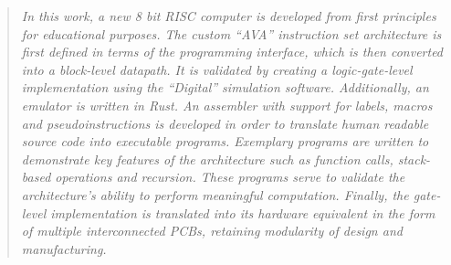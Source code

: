 \renewcommand{\abstractname}{Abstract}
\begin{abstract}
    \itshape
    In this work, a new 8 bit RISC computer is developed from first principles for educational purposes. The custom ``AVA'' instruction set architecture is first defined in terms of the programming interface, which is then converted into a block-level datapath. It is validated by creating a logic-gate-level implementation using the ``Digital'' simulation software. Additionally, an emulator is written in Rust. An assembler with support for labels, macros and pseudoinstructions is developed in order to translate human readable source code into executable programs. Exemplary programs are written to demonstrate key features of the architecture such as function calls, stack-based operations and recursion. These programs serve to validate the architecture's ability to perform meaningful computation. Finally, the gate-level implementation is translated into its hardware equivalent in the form of multiple interconnected PCBs, retaining modularity of design and manufacturing.
\end{abstract}

